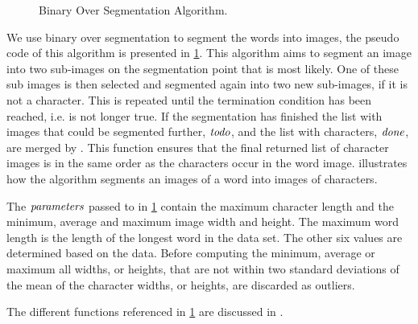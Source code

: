 \newcommand{\body}{\ensuremath{\t{body}}\xspace}
\newcommand{\strokewidth}{\ensuremath{\t{stroke\_w}}\xspace}
\newcommand{\segmentationpoints}{\ensuremath{\t{sps}}\xspace}
\newcommand{\segmentationpoint}{\ensuremath{\t{sp}}\xspace}
\newcommand{\image}{\ensuremath{\t{image}}\xspace}
\newcommand{\subimage}{\ensuremath{\t{sub\_image}}\xspace}
\newcommand{\leftsubimage}{\ensuremath{\t{left}}\xspace}
\newcommand{\rightsubimage}{\ensuremath{\t{right}}\xspace}
\newcommand{\segmentfurther}{\ensuremath{\t{todo}}\xspace}
\newcommand{\characters}{\ensuremath{\t{done}}\xspace}
\newcommand{\parameters}{\ensuremath{\t{parameters}}\xspace}

\begin{figure}
	
	\caption{Binary Over Segmentation Algorithm.}
	\label{alg:method:segmentation:algorithm}
\end{figure}

We use binary over segmentation to segment the words into images, the pseudo code of this algorithm is presented in \cref{alg:method:segmentation:algorithm}. This algorithm aims to segment an image into two sub-images on the segmentation point that is most likely. One of these sub images is then selected and segmented again into two new sub-images, if it is not a character. This is repeated until the termination condition has been reached, i.e.  is not longer true. If the segmentation has finished the list with images that could be segmented further, \segmentfurther, and the list with characters, \characters, are merged by . This function ensures that the final returned list of character images is in the same order as the characters occur in the word image.  illustrates how the algorithm segments an images of a word into images of characters.

The \parameters passed to  in \cref{alg:method:segmentation:algorithm} contain the maximum character length and the minimum, average and maximum image width and height. The maximum word length is the length of the longest word in the data set. The other six values are determined based on the data. Before computing the minimum, average or maximum all widths, or heights, that are not within two standard deviations of the mean of the character widths, or heights, are discarded as outliers. 

The different functions referenced in \cref{alg:method:segmentation:algorithm} are discussed in .

